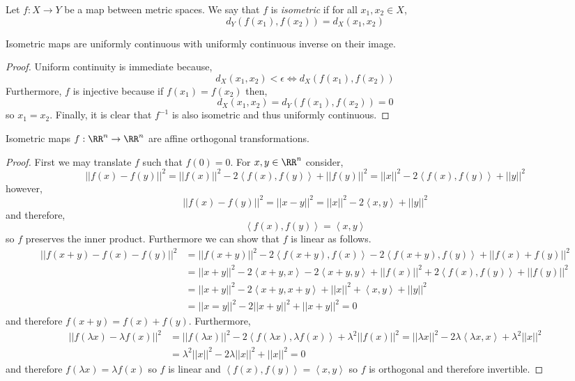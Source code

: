 \documentclass[12pt]{article}
\begin{document}
\newcommand{\inner}[2]{\left< #1, #2 \right>}

\begin{defn}
Let $f : X \to Y$ be a map between metric spaces. We say that $f$ is \textit{isometric} if for all $x_1, x_2 \in X$,
\[ d_Y(f(x_1), f(x_2)) = d_X(x_1, x_2) \]
\end{defn}

\begin{prop}
Isometric maps are uniformly continuous with uniformly continuous inverse on their image.
\end{prop}

\begin{proof}
Uniform continuity is immediate because,
\[ d_X(x_1, x_2) < \epsilon \iff d_X(f(x_1), f(x_2)) \]
Furthermore, $f$ is injective because if $f(x_1) = f(x_2)$ then,
\[ d_X(x_1, x_2) = d_Y(f(x_1), f(x_2)) = 0 \]
so $x_1 = x_2$. Finally, it is clear that $f^{-1}$ is also isometric and thus uniformly continuous.
\end{proof}

\begin{prop}
Isometric maps $f : \RR^n \to \RR^n$ are affine orthogonal transformations.
\end{prop}

\begin{proof}
First we may translate $f$ such that $f(0) = 0$.
For $x,y \in \RR^n$ consider,
\[ ||f(x) - f(y)||^2  = || f(x) ||^2 - 2 \inner{f(x)}{f(y)} + || f(y) ||^2 = || x ||^2 - 2 \inner{f(x)}{f(y)} + || y ||^2 \]
however,
\[ || f(x) - f(y) ||^2 = || x - y ||^2 = || x ||^2 - 2 \inner{x}{y} + || y ||^2 \]
and therefore,
\[ \inner{f(x)}{f(y)} = \inner{x}{y} \]
so $f$ preserves the inner product. Furthermore we can show that $f$ is linear as follows. 
\begin{align*}
|| f(x + y) - f(x) - f(y) ||^2 & = || f(x + y) ||^2 - 2 \inner{f(x+y)}{f(x)} - 2 \inner{f(x+y)}{f(y)} + || f(x) + f(y) ||^2
\\
& = || x + y ||^2 - 2 \inner{x+y}{x} - 2 \inner{x+y}{y} + || f(x) ||^2 + 2 \inner{f(x)}{f(y)} + || f(y) ||^2
\\
& = || x + y ||^2 - 2 \inner{x+y}{x+y} + || x ||^2 + \inner{x}{y} + || y ||^2
\\
& = || x = y ||^2 - 2 || x + y ||^2 + || x + y ||^2 = 0
\end{align*}
and therefore $f(x + y) = f(x) + f(y)$. Furthermore, 
\begin{align*}
|| f(\lambda x) - \lambda f(x) ||^2 & = || f(\lambda x) ||^2 - 2 \inner{f(\lambda x)}{\lambda f(x)} + \lambda^2 || f(x) ||^2 = || \lambda x ||^2 - 2 \lambda \inner{\lambda x}{x} + \lambda^2 || x ||^2 
\\
& = \lambda^2 || x ||^2 - 2 \lambda || x ||^2 + || x ||^2 = 0
\end{align*}
and therefore $f(\lambda x) = \lambda f(x)$ so $f$ is linear and $\inner{f(x)}{f(y)} = \inner{x}{y}$ so $f$ is orthogonal and therefore invertible.
\end{proof}
\end{document}
